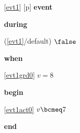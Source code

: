 \noindent \ref{evt1} [p] \textbf{event}
\begin{block}
  \item   \textbf{during}
  \begin{block}
  \item[ (\ref{evt1}/default) ]{$\false $} %
  \end{block}
  \item   \textbf{when}
  \begin{block}
  \item[ \eqref{evt1grd0} ]{$v = 8$} %
  \end{block}
  \item   \textbf{begin}
  \begin{block}
  \item[ \eqref{evt1act0} ]{$v \bcmeq 7$} %
  \end{block}
  \item   \textbf{end} \\
\end{block}
